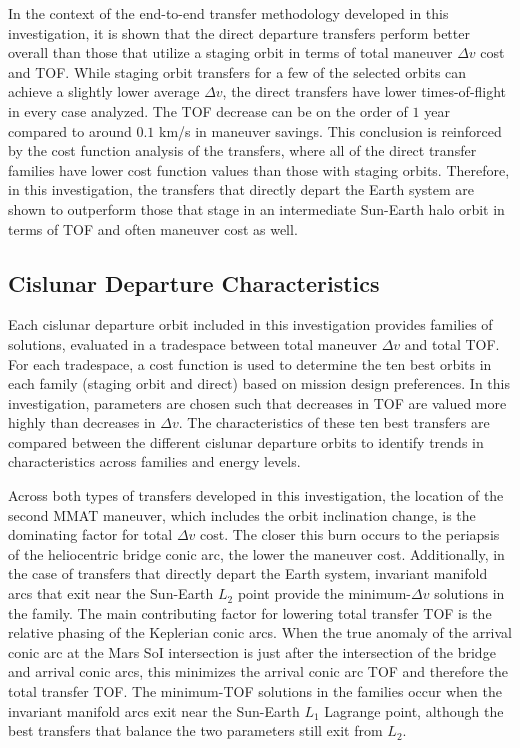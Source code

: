 In the context of the end-to-end transfer methodology developed in this investigation, it is shown
that the direct departure transfers perform better overall than those that utilize a staging orbit
in terms of total maneuver $\Delta v$ cost and TOF. While staging orbit transfers for a few of the
selected orbits can achieve a slightly lower average $\Delta v$, the direct transfers have lower
times-of-flight in every case analyzed. The TOF decrease can be on the order of $1$ year compared
to around $0.1$ km/s in maneuver savings. This conclusion is reinforced by the cost function
analysis of the transfers, where all of the direct transfer families have lower cost function
values than those with staging orbits. Therefore, in this investigation, the transfers that
directly depart the Earth system are shown to outperform those that stage in an intermediate
Sun-Earth halo orbit in terms of TOF and often maneuver cost as well.

\subsection{Cislunar Departure Characteristics}
Each cislunar departure orbit included in this investigation provides families of solutions,
evaluated in a tradespace between total maneuver $\Delta v$ and total TOF. For each tradespace, a
cost function is used to determine the ten best orbits in each family (staging orbit and direct)
based on mission design preferences. In this investigation, parameters are chosen such that
decreases in TOF are valued more highly than decreases in $\Delta v$. The characteristics of these
ten best transfers are compared between the different cislunar departure orbits to identify trends
in characteristics across families and energy levels.

Across both types of transfers developed in this investigation, the location of the second MMAT
maneuver, which includes the orbit inclination change, is the dominating factor for total
$\Delta v$ cost. The closer this burn occurs to the periapsis of the heliocentric bridge conic arc,
the lower the maneuver cost. Additionally, in the case of transfers that directly depart the Earth
system, invariant manifold arcs that exit near the Sun-Earth $L_{2}$ point provide the
minimum-$\Delta v$ solutions in the family. The main contributing factor for lowering total
transfer TOF is the relative phasing of the Keplerian conic arcs. When the true anomaly of the
arrival conic arc at the Mars SoI intersection is just after the intersection of the bridge and
arrival conic arcs, this minimizes the arrival conic arc TOF and therefore the total transfer TOF.
The minimum-TOF solutions in the families occur when the invariant manifold arcs exit near the
Sun-Earth $L_{1}$ Lagrange point, although the best transfers that balance the two parameters still
exit from $L_{2}$.

